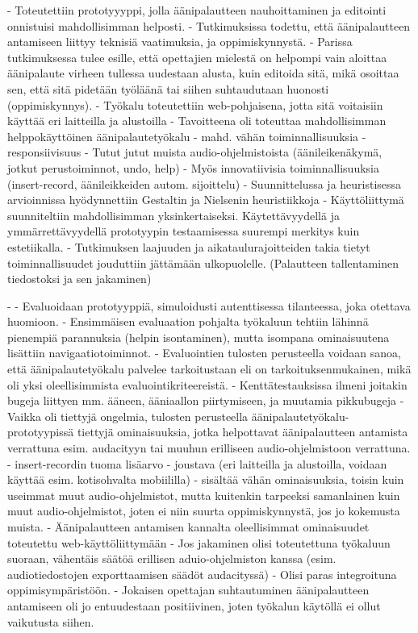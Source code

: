 \documentclass[utf8]{gradu3}
\begin{document}
- Toteutettiin prototyyyppi, jolla äänipalautteen nauhoittaminen ja editointi onnistuisi mahdollisimman helposti.
- Tutkimuksissa todettu, että äänipalautteen antamiseen liittyy teknisiä vaatimuksia, ja oppimiskynnystä.
- Parissa tutkimuksessa tulee esille, että opettajien mielestä on helpompi vain aloittaa äänipalaute virheen tullessa uudestaan alusta, kuin editoida sitä, mikä osoittaa sen, että sitä pidetään työläänä tai siihen suhtaudutaan huonosti (oppimiskynnys).
- Työkalu toteutettiin web-pohjaisena, jotta sitä voitaisiin käyttää eri laitteilla ja alustoilla
- Tavoitteena oli toteuttaa mahdollisimman helppokäyttöinen äänipalautetyökalu
	- mahd. vähän toiminnallisuuksia
	- responsiivisuus
	- Tutut jutut muista audio-ohjelmistoista (äänileikenäkymä, jotkut perustoiminnot, undo, help)
	- Myös innovatiivisia toiminnallisuuksia (insert-record, äänileikkeiden autom. sijoittelu)
- Suunnittelussa ja heuristisessa arvioinnissa hyödynnettiin Gestaltin ja Nielsenin heuristiikkoja
- Käyttöliittymä suunniteltiin mahdollisimman yksinkertaiseksi. Käytettävyydellä ja ymmärrettävyydellä prototyypin testaamisessa suurempi merkitys kuin estetiikalla.
- Tutkimuksen laajuuden ja aikataulurajoitteiden takia tietyt toiminnallisuudet jouduttiin jättämään ulkopuolelle. (Palautteen tallentaminen tiedostoksi ja sen jakaminen)

- 
- Evaluoidaan prototyyppiä, simuloidusti autenttisessa tilanteessa, joka otettava huomioon.
- Ensimmäisen evaluaation pohjalta työkaluun tehtiin lähinnä pienempiä parannuksia (helpin isontaminen), mutta isompana ominaisuutena lisättiin navigaatiotoiminnot.
- Evaluointien tulosten perusteella voidaan sanoa, että äänipalautetyökalu palvelee tarkoitustaan eli on tarkoituksenmukainen, mikä oli yksi oleellisimmista evaluointikriteereistä.
- Kenttätestauksissa ilmeni joitakin bugeja liittyen mm. ääneen, ääniaallon piirtymiseen, ja muutamia pikkubugeja
- Vaikka oli tiettyjä ongelmia, tulosten perusteella äänipalautetyökalu-prototyypissä tiettyjä ominaisuuksia, jotka helpottavat äänipalautteen antamista verrattuna esim. audacityyn tai muuhun erilliseen audio-ohjelmistoon verrattuna. 
	- insert-recordin tuoma lisäarvo
	- joustava (eri laitteilla ja alustoilla, voidaan käyttää esim. kotisohvalta mobiililla)
	- sisältää vähän ominaisuuksia, toisin kuin useimmat muut audio-ohjelmistot, mutta kuitenkin tarpeeksi samanlainen kuin muut audio-ohjelmistot, joten ei niin suurta oppimiskynnystä, jos jo kokemusta muista.
	- Äänipalautteen antamisen kannalta oleellisimmat ominaisuudet toteutettu web-käyttöliittymään
	- Jos jakaminen olisi toteutettuna työkaluun suoraan, vähentäis säätöä erillisen aduio-ohjelmiston kanssa (esim. audiotiedostojen exporttaamisen säädöt audacityssä)
	- Olisi paras integroituna oppimisympäristöön.
- Jokaisen opettajan suhtautuminen äänipalautteen antamiseen oli jo entuudestaan positiivinen, joten työkalun käytöllä ei ollut vaikutusta siihen.
\end{document}
